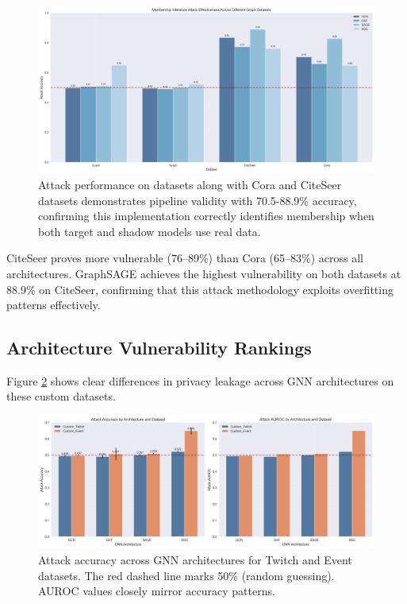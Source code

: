 \documentclass{article}
\begin{document}
\begin{figure}[H]
\centering
\includegraphics[width=\textwidth]{../Results/visualizations/comprehensive_datasets_comparison.png}
\caption{Attack performance on datasets along with Cora and CiteSeer datasets demonstrates pipeline validity with 70.5-88.9\% accuracy, confirming this implementation correctly identifies membership when both target and shadow models use real data.}
\label{fig:baseline}
\end{figure}

CiteSeer proves more vulnerable (76--89\%) than Cora (65--83\%) across all architectures. GraphSAGE achieves the highest vulnerability on both datasets at 88.9\% on CiteSeer, confirming that this attack methodology exploits overfitting patterns effectively.

\subsection{Architecture Vulnerability Rankings}
Figure \ref{fig:attack-performance} shows clear differences in privacy leakage across GNN architectures on these custom datasets.

\begin{figure}[H]
\centering
\includegraphics[width=\textwidth]{../Results/visualizations/attack_performance_comparison.png}
\caption{Attack accuracy across GNN architectures for Twitch and Event datasets. The red dashed line marks 50\% (random guessing). AUROC values closely mirror accuracy patterns.}
\label{fig:attack-performance}
\end{figure}
\end{document}
